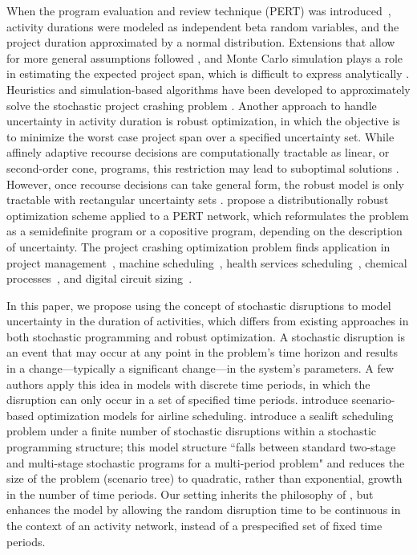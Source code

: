 \documentclass[11pt]{article}
\begin{document}
	When the program evaluation and review technique (PERT) was introduced~\citep{malcolm1959application}, activity durations were modeled as independent beta random variables, and the project duration approximated by a normal distribution. Extensions that allow for more general assumptions followed \citep{Elmaghraby77}, and Monte Carlo simulation plays a role in estimating the expected project span, which is difficult to express analytically \citep{burt1971conditional,van1963letter}.
	Heuristics and simulation-based algorithms have been developed to approximately solve the stochastic project crashing problem \citep{aghaie2009ant, bowman1994stochastic, ke2014genetic, kim2007heuristic}. Another approach to handle uncertainty in activity duration is robust optimization, in which the objective is to minimize the worst case project span over a specified uncertainty set. While affinely adaptive recourse decisions are computationally tractable as linear, or second-order cone, programs, this restriction may lead to suboptimal solutions \citep{chen2008linear, cohen2007stochastic}. However, once recourse decisions can take general form, the robust model is only tractable with rectangular uncertainty sets
	\citep{wiesemann2012robust}. \citet{ahipasaoglu2016distributionally} propose a distributionally robust optimization scheme applied to a PERT network, which reformulates the problem as a semidefinite program or a copositive program, depending on the description of uncertainty. The project crashing optimization problem finds application in project management~\citep{demeulemeester2006project, jaselskis1991allocation,tonchia2018industrial}, machine scheduling~\citep{blazewicz1983scheduling,hall1996machine}, health services scheduling~\citep{cardoen2010operating}, chemical processes~\citep{li2008process}, and digital circuit sizing~\citep{kim2007heuristic}.

	In this paper, we propose using the concept of stochastic disruptions to model uncertainty in the duration of activities, which differs from existing approaches in both stochastic programming and robust optimization. A stochastic disruption is an event that may occur at any point in the problem's time horizon and results in a change---typically a significant change---in the system's parameters. A few authors apply this idea in models with discrete time periods, in which the disruption can only occur in a set of specified time periods. \citet{yu2004disruptionmgt} introduce scenario-based optimization models for airline scheduling. \citet{morton2009sealift} introduce a sealift scheduling problem under a finite number of stochastic disruptions within a stochastic programming structure; this model structure ``falls between standard two-stage and multi-stage stochastic programs for a multi-period problem" and reduces the size of the problem (scenario tree) to quadratic, rather than exponential, growth in the number of time periods. Our setting inherits the philosophy of \citet{morton2009sealift}, but enhances the model by allowing the random disruption time to be continuous in the context of an activity network, instead of a prespecified set of fixed time periods. 
\end{document}
